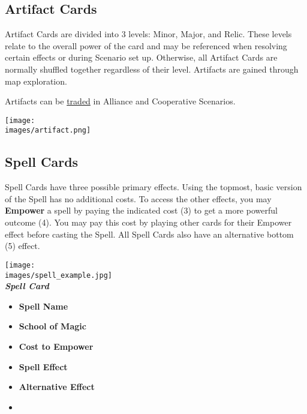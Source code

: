 \begin{multicols*}{2}
\subsection*{Artifact Cards}
Artifact Cards are divided into 3 levels: Minor, Major, and Relic.
These levels relate to the overall power of the card and may be referenced when resolving certain effects or during Scenario set up.
Otherwise, all Artifact Cards are normally shuffled together regardless of their level.
Artifacts are gained through map exploration.\par
Artifacts can be \hyperlink{Trading}{traded} in Alliance and Cooperative Scenarios.\par
\texttt{[image: \\images/artifact.png]}

\subsection*{\hypertarget{spells}{Spell Cards}}


Spell Cards have three possible primary effects.
Using the topmost, basic version of the Spell has no additional costs.
To access the other effects, you may \textbf{Empower} a spell by paying the indicated cost (3) to get a more powerful outcome (4).
You may pay this cost by playing other cards for their Empower  effect before casting the Spell.
All Spell Cards also have an alternative bottom (5)  effect.\par

\filbreak
\begin{center}
  \texttt{[image: \\images/spell\_example.jpg]}\\
  \medskip
  \footnotesize{\textbf{\textit{\textcolor{darkcandyapplered}{Spell Card}}}}
  \scriptsize
  \begin{multicols}{2}
    \begin{itemize}[itemsep=5pt]
      \item[\textbf{1.}] \textbf{Spell Name}
      \item[\textbf{2.}] \textbf{School of Magic}
      \item[\textbf{3.}] \textbf{Cost to Empower}
      \item[\textbf{4.}] \textbf{Spell Effect}
      \item[\textbf{5.}] \textbf{Alternative Effect}
      \item[]
    \end{itemize}
  \end{multicols}
\end{center}


\end{multicols*}

